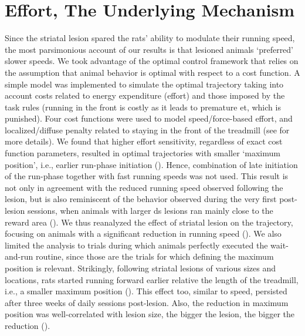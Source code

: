 \section{Effort, The Underlying Mechanism}
\label{ch:lesion:effort}

Since the striatal lesion spared the rats' ability to modulate their running speed, the most parsimonious account of our results is that lesioned animals `preferred' slower speeds.
We took advantage of the optimal control framework that relies on the assumption that animal behavior is optimal with respect to a cost function.
A simple model was implemented to simulate the optimal trajectory taking into account costs related to energy expenditure (effort) and those imposed by the task rules (running in the front is costly as it leads to premature \gls{et}, which is punished).
Four cost functions were used to model speed/force-based effort, and localized/diffuse penalty related to staying in the front of the treadmill (see \cite{JuradoParras2020} for more details).
We found that higher effort sensitivity, regardless of exact cost function parameters, resulted in optimal trajectories with smaller `maximum position', i.e., earlier run-phase initiation ().
Hence, combination of late initiation of the run-phase together with fast running speeds was not used.
This result is not only in agreement with the reduced running speed observed following the lesion, but is also reminiscent of the behavior observed during the very first post-lesion sessions, when animals with larger \gls{ds} lesions ran mainly close to the reward area (). 
We thus reanalyzed the effect of striatal lesion on the trajectory, focusing on animals with a significant reduction in running speed ().
We also limited the analysis to trials during which animals perfectly executed the wait-and-run routine, since those are the trials for which defining the maximum position is relevant.
Strikingly, following striatal lesions of various sizes and locations, rats started running forward earlier relative the length of the treadmill, i.e., a smaller maximum position ().
This effect too, similar to speed, persisted after three weeks of daily sessions post-lesion.
Also, the reduction in maximum position was well-correlated with lesion size, the bigger the lesion, the bigger the reduction ().








